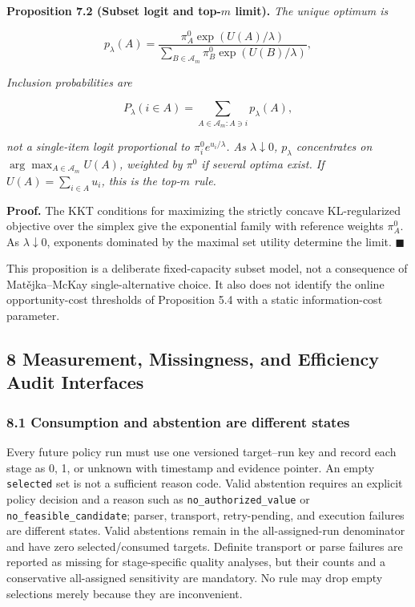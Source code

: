 \documentclass[
  11pt]{article}
\begin{document}
\textbf{Proposition 7.2 (Subset logit and top-\(m\) limit).} \emph{The
unique optimum is}

\[p_\lambda(A)=\frac{\pi^0_A\exp(U(A)/\lambda)}{\sum_{B\in\mathcal A_m}\pi^0_B\exp(U(B)/\lambda)},\tag{11}\]

\emph{Inclusion probabilities are}

\[P_\lambda(i\in A)=\sum_{A\in\mathcal A_m:A\ni i}p_\lambda(A),\]

\emph{not a single-item logit proportional to
\(\pi_i^0e^{u_i/\lambda}\). As \(\lambda\downarrow0\), \(p_\lambda\)
concentrates on \(\arg\max_{A\in\mathcal A_m}U(A)\), weighted by
\(\pi^0\) if several optima exist. If \(U(A)=\sum_{i\in A}u_i\), this is
the top-\(m\) rule.}

\textbf{Proof.} The KKT conditions for maximizing the strictly concave
KL-regularized objective over the simplex give the exponential family
with reference weights \(\pi_A^0\). As \(\lambda\downarrow0\), exponents
dominated by the maximal set utility determine the limit.
\(\blacksquare\)

This proposition is a deliberate fixed-capacity subset model, not a
consequence of Matějka--McKay single-alternative choice. It also does
not identify the online opportunity-cost thresholds of Proposition 5.4
with a static information-cost parameter.

\subsection{8 Measurement, Missingness, and Efficiency Audit
Interfaces}\label{measurement-missingness-and-efficiency-audit-interfaces}

\subsubsection{8.1 Consumption and abstention are different
states}\label{consumption-and-abstention-are-different-states}

Every future policy run must use one versioned target--run key and
record each stage as 0, 1, or unknown with timestamp and evidence
pointer. An empty \texttt{selected} set is not a sufficient reason code.
Valid abstention requires an explicit policy decision and a reason such
as \texttt{no\_authorized\_value} or \texttt{no\_feasible\_candidate};
parser, transport, retry-pending, and execution failures are different
states. Valid abstentions remain in the all-assigned-run denominator and
have zero selected/consumed targets. Definite transport or parse
failures are reported as missing for stage-specific quality analyses,
but their counts and a conservative all-assigned sensitivity are
mandatory. No rule may drop empty selections merely because they are
inconvenient.
\end{document}
